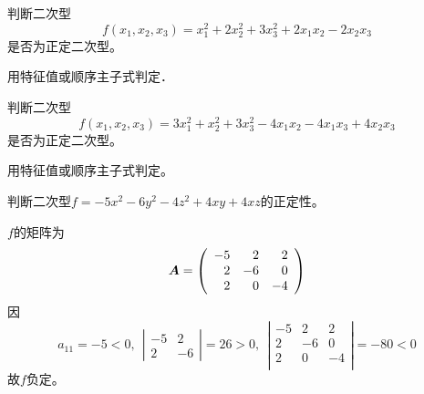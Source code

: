 \begin{frame}
  
    \begin{li}[\red{$\bigstar$}]
      判断二次型
      $$
      f(x_1,x_2,x_3)=x_1^2+2x_2^2+3x_3^2+2x_1x_2-2x_2x_3
      $$
      是否为正定二次型。
    \end{li}
    \begin{jie}
      用特征值或顺序主子式判定．
    \end{jie}
\end{frame}

\begin{frame}
  
    \begin{li}[\red{$\bigstar$}]
      判断二次型
      $$
      f(x_1,x_2,x_3)=3x_1^2+x_2^2+3x_3^2-4x_1x_2-4x_1x_3+4x_2x_3
      $$
      是否为正定二次型。
    \end{li}
    \begin{jie}
      用特征值或顺序主子式判定。
    \end{jie}
\end{frame}

\begin{frame}
\begin{li}[\red{$\bigstar$}]
  判断二次型$f=-5x^2-6y^2-4z^2+4xy+4xz$的正定性。
\end{li}
\pause
\begin{jie}
  $f$的矩阵为
  $$
  \boldsymbol{A}=\left(
    \begin{array}{rrr}
      -5&2&2\\
      2&-6&0\\
      2&0&-4\\
    \end{array}
  \right)
  $$
  因
  $$
  a_{11}=-5<0, ~~\left|
    \begin{array}{rr}
      -5&2\\
      2&-6
    \end{array}
  \right|=26>0, ~~\left|
    \begin{array}{rrr}
      -5&2&2\\
      2&-6&0\\
      2&0&-4\\
    \end{array}
  \right|=-80<0
  $$
  故$f$负定。
\end{jie}
\end{frame}
